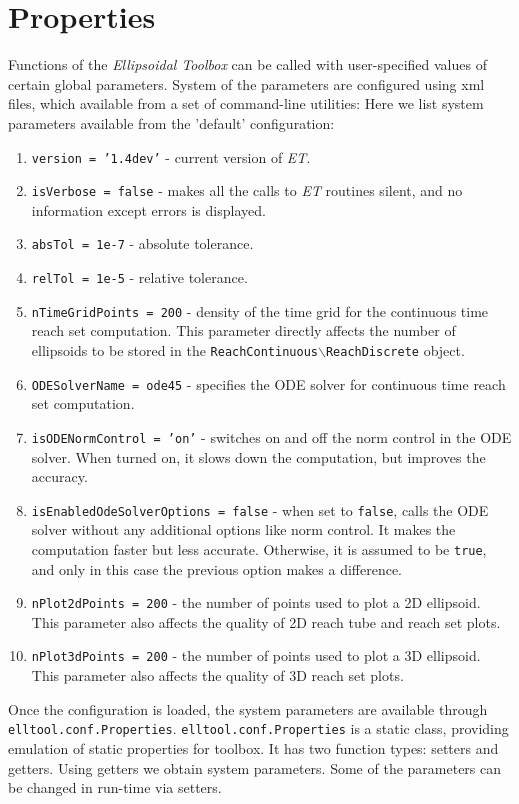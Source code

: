 \section{Properties}
Functions of the {\it Ellipsoidal Toolbox} can be called with
user-specified values of certain global parameters. System of the parameters
are configured using xml files, which  available from a set of command-line
utilities:
Here we list system parameters available from the 'default' configuration:
\begin{enumerate}
\item {\tt version = '1.4dev'} - current version of {\it ET}.
\item {\tt isVerbose = false} - makes all the calls to {\it ET}
routines silent, and no information except errors is displayed.
\item {\tt absTol = 1e-7} - absolute tolerance.
\item {\tt relTol = 1e-5} - relative tolerance.
\item {\tt nTimeGridPoints = 200} - density of the time grid for the
continuous time reach set computation.
This parameter directly affects the number of ellipsoids to
be stored in the {\tt ReachContinuous$\backslash$ReachDiscrete} object.
\item {\tt ODESolverName = ode45} - specifies the ODE solver for continuous time
reach set computation.
\item {\tt isODENormControl = 'on'} - switches on and off the norm control
in the ODE solver. When turned on, it slows down the computation, but improves
the accuracy.
\item {\tt isEnabledOdeSolverOptions = false} - when set to {\tt false}, calls the ODE solver
without any additional options like norm control. It makes the computation
faster but less accurate. Otherwise, it is assumed to be {\tt true}, and only in this
case the previous option makes a difference.
\item {\tt nPlot2dPoints = 200} - the number of points used to plot a
2D ellipsoid. This parameter also affects the quality of 2D reach tube
and reach set plots.
\item {\tt nPlot3dPoints = 200} - the number of points used to plot
a 3D ellipsoid. This parameter also affects the quality of 3D reach set plots.
\end{enumerate}
Once the configuration is loaded, the system parameters are available through
{\tt elltool.conf.Properties}.
{\tt elltool.conf.Properties} is a static class, providing emulation of static
properties for toolbox. It has two function types: setters and getters.
Using getters we obtain system parameters.
 Some of the parameters can be changed
in run-time via setters.
